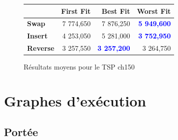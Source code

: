 \documentclass[a4paper,10pt]{report}
\begin{document}
\begin{figure}[h]
  \begin{center}
    \begin{tabular}{|l|r|r|r|}
      \hline
      &		\textbf{First Fit}&	\textbf{Best Fit}&	\textbf{Worst
Fit}\\\hline
      \textbf{Swap}&
	  7 774,650&
	  7 876,250&
	  \textbf{\textcolor{blue}{5 949,600}}\\\hline
      \textbf{Insert}&
	  4 253,050&
	  5 281,000&
	  \textbf{\textcolor{blue}{3 752,950}}\\\hline
      \textbf{Reverse}&
	  3 257,550&
	  \textbf{\textcolor{blue}{3 257,200}}&
	  3 264,750\\\hline
    \end{tabular}
    \caption{Résultats moyens pour le TSP ch150}
  \end{center}
\end{figure}

\section{Graphes d'exécution}

\subsection{Portée}

\end{document}
